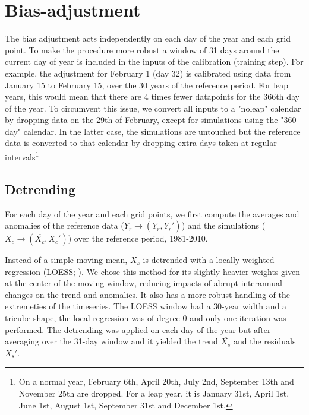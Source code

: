 \documentclass[letterpaper,10pt]{article}
\begin{document}
\section{Bias-adjustment}
The bias adjustment acts independently on each day of the year and each grid point.
To make the procedure more robust a window of 31 days around the current day of year is included in the inputs of the calibration (training step).
For example, the adjustment for February 1 (day 32) is calibrated using data from January 15 to February 15, over the 30 years of the reference period. 
For leap years, this would mean that there are 4 times fewer datapoints for the 366th day of the year.
To circumvent this issue, we convert all inputs to a "noleap" calendar by dropping data on the 29th of February, except for simulations using the "360 day" calendar.
In the latter case, the simulations are untouched but the reference data is converted to that calendar by dropping extra days taken at regular intervals\footnote{On a normal year, February 6th, April 20th, July 2nd, September 13th and November 25th are dropped. For a leap year, it is January 31st, April 1st, June 1st, August 1st, September 31st and December 1st.}

\subsection{Detrending}
For each day of the year and each grid points, we first compute the averages and anomalies of the reference data ($Y_r \to (\overline{Y_r}, Y_r')$) and the simulations ($X_c\to (\overline{X_c}, X_c')$) over the reference period, 1981-2010. 

Instead of a simple moving mean, $X_s$ is detrended with a locally weighted regression (LOESS; \cite{Cleveland79}).
We chose this method for its slightly heavier weights given at the center of the moving window, reducing impacts of abrupt interannual changes on the trend and anomalies. It also has a more robust handling of the extremeties of the timeseries.
The LOESS window had a 30-year width and a tricube shape, the local regression was of degree 0 and only one iteration was performed.
The detrending was applied on each day of the year but after averaging over the 31-day window and it yielded the trend $\overline{X_s}$ and the residuals $X_s'$.
\end{document}
